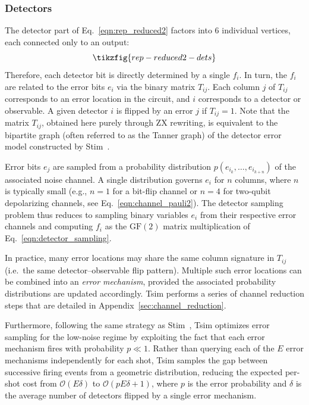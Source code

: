 \documentclass[
  a4paper,
  onecolumn,
  11pt,
  allowtoday
]{quantumarticle}
\newcommand{\bigO}[1]{\mathcal{O}(#1)}
\newcommand{\FF}{\mathrm{GF}(2)}
\newcommand{\nerr}{E}            %
\newcommand{\navgflip}{\delta}   %
\newcommand{\perr}{p}            %
\begin{document}
\subsubsection{Detectors}
\label{sec:detector-sampling}

The detector part of Eq.~\eqref{eqn:rep_reduced2} factors into 6 individual vertices, each connected only to an output:
\begin{equation}
  \tikzfig{rep-reduced2-dets}
  \label{eqn:dets-only}
\end{equation}
Therefore, each detector bit is directly determined by a single $f_i$.
In turn, the $f_i$ are related to the error bits $e_i$ via the binary matrix $T_{ij}$.
Each column $j$ of $T_{ij}$ corresponds to an error location in the circuit,
and $i$ corresponds to a detector or observable. A given detector $i$ is flipped
by an error $j$ if $T_{ij} = 1$. Note that the matrix $T_{ij}$, obtained here purely through ZX rewriting, is equivalent to the bipartite graph (often referred to as the Tanner graph) of the detector error model constructed by Stim~\cite{gidney2021stim}.

Error bits $e_j$ are sampled from a probability distribution $p(e_{i_k}, \ldots, e_{i_{k+n}})$ of the associated noise channel. A single distribution governs $e_i$ for $n$ columns, where $n$ is typically small (e.g., $n=1$ for a bit-flip channel or $n=4$ for two-qubit depolarizing channels, see Eq.~\eqref{eqn:channel_pauli2}). The detector sampling problem thus reduces to sampling binary variables $e_i$ from their respective error channels
and computing $f_i$ as the $\FF$ matrix multiplication of Eq.~\eqref{eqn:detector_sampling}.

In practice, many error locations may share the same column signature in $T_{ij}$ (i.e.\ the same detector--observable flip pattern). Multiple such error locations can be combined into an \textit{error mechanism}, provided the associated probability distributions are updated accordingly. Tsim performs a series of channel reduction steps that are detailed in Appendix~\ref{sec:channel_reduction}.

Furthermore, following the same strategy as Stim~\cite{gidney2021stim}, Tsim optimizes error sampling for the low-noise regime by exploiting the fact that each error mechanism fires with probability $\perr \ll 1$. Rather than querying each of the $\nerr$ error mechanisms independently for each shot, Tsim samples the gap between successive firing events from a geometric distribution, reducing the expected per-shot cost from $\bigO{\nerr \navgflip}$ to $\bigO{\perr \nerr \navgflip + 1}$, where $\perr$ is the error probability and $\navgflip$ is the average number of detectors flipped by a single error mechanism.
\end{document}
